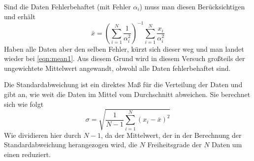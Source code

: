Sind die Daten Fehlerbehaftet (mit Fehler \( \alpha_i \)) muss man diesen Berücksichtigen und erhält
\begin{equation}\label{eqn:mean2}
	\bar{x} = \left(\sum_{i=1}^{N} \frac{1}{\alpha_i^2}\right)^{-1} \sum_{i=1}^{N} \frac{x_i}{\alpha_i^2}
\end{equation}
Haben alle Daten aber den selben Fehler, kürzt sich dieser weg und man landet wieder bei \autoref{eqn:mean1}. Aus diesem Grund wird in diesem Versuch großteils der ungewichtete Mittelwert angewandt, obwohl alle Daten fehlerbehaftet sind. 

Die Standardabweichung ist ein direktes Maß für die Verteilung der Daten und gibt an, wie weit die Daten im Mittel vom Durchschnitt abweichen. Sie berechnet sich wie folgt
\begin{equation}\label{eqn:sigma}
	\sigma = \sqrt{\frac{1}{N-1} \sum_{i=1}^{N}(x_i - \bar{x})^2}
\end{equation}
Wie dividieren hier durch \( N-1 \), da der Mittelwert, der in der Berechnung der Standardabweichung herangezogen wird, die \( N \) Freiheitsgrade der  \( N \) Daten um einen reduziert.
